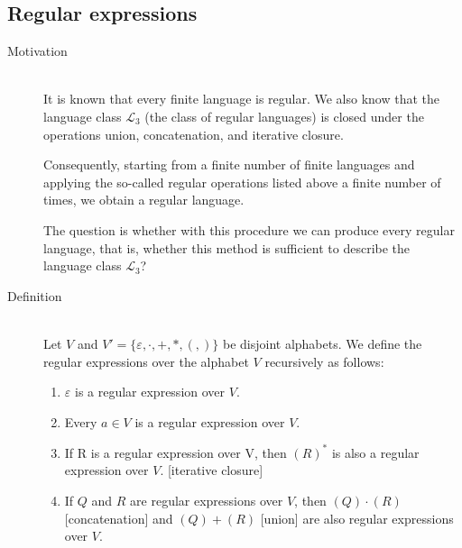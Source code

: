 \documentclass[margin=0px]{article}
\begin{document}
\subsection{Regular expressions}
\begin{description}
    \item[Motivation] \hfill \\
        It is known that every finite language is regular. We also know that the language class $\mathcal{L}_3$ (the class of regular languages) is closed under the operations union, concatenation, and iterative closure.

        Consequently, starting from a finite number of finite languages and applying the so-called regular operations listed above a finite number of times, we obtain a regular language.

        The question is whether with this procedure we can produce every regular language, that is, whether this method is sufficient to describe the language class $\mathcal{L}_3$?
    \item[Definition] \hfill \\
        Let $V$ and $V' = \{\varepsilon, \cdot, +, *, (, )\}$ be disjoint alphabets. We define the regular expressions over the alphabet $V$ recursively as follows:
        \begin{enumerate}
            \item $\varepsilon$ is a regular expression over $V$.
            \item Every $a \in V$ is a regular expression over $V$.
            \item If R is a regular expression over V, then $(R)^*$ is also a regular expression over $V$. [iterative closure]
            \item If $Q$ and $R$ are regular expressions over $V$, then $(Q) \cdot (R)$ [concatenation] and $(Q) + (R)$ [union] are also regular expressions over $V$.
        \end{enumerate}


\end{description}
\end{document}
